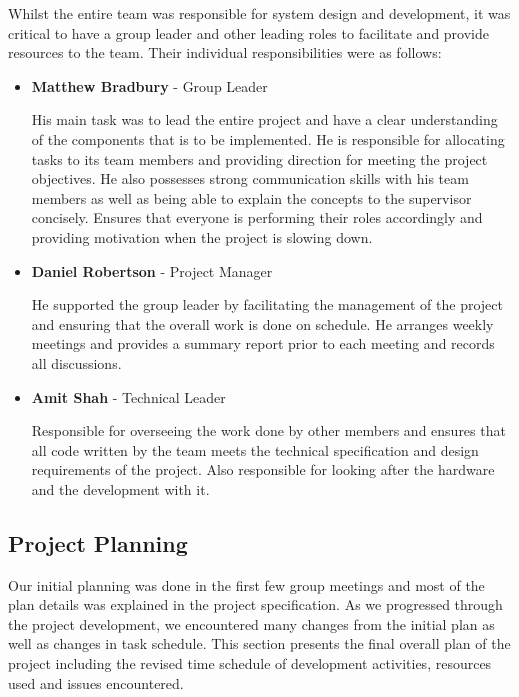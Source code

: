 Whilst the entire team was responsible for system design and development, it was critical to have a group leader and other leading roles to facilitate and provide resources to the team. Their individual responsibilities were as follows:

\begin{itemize}
	\item[] {\bf Matthew Bradbury} - Group Leader
	
	His main task was to lead the entire project and have a clear understanding of the components that is to be implemented. He is responsible for allocating tasks to its team members and providing direction for meeting the project objectives. He also possesses strong communication skills with his team members as well as being able to explain the concepts to the supervisor concisely. Ensures that everyone is performing their roles accordingly and providing motivation when the project is slowing down.	

	\item[] {\bf Daniel Robertson} - Project Manager
	
	He supported the group leader by facilitating the management of the project and ensuring that the overall work is done on schedule. He arranges weekly meetings and provides a summary report prior to each meeting and records all discussions.
	
	\item[] {\bf Amit Shah} - Technical Leader
	
	Responsible for overseeing the work done by other members and ensures that all code written by the team meets the technical specification and design requirements of the project. Also responsible for looking after the hardware and the development with it.
	
\end{itemize}

\subsection{Project Planning}

Our initial planning was done in the first few group meetings and most of the plan details was explained in the project specification. As we progressed through the project development, we encountered many changes from the initial plan as well as changes in task schedule. This section presents the final overall plan of the project including the revised time schedule of development activities, resources used and issues encountered.

